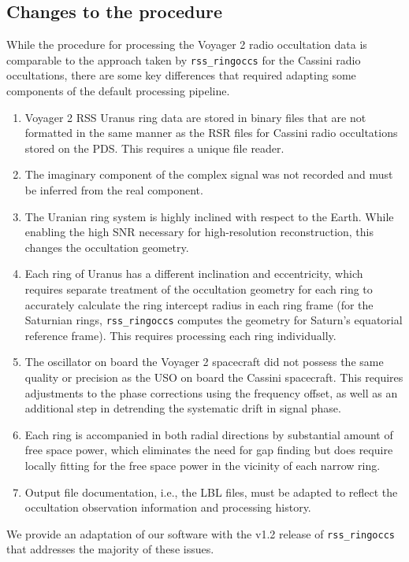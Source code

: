 \documentclass[titlepage, 12pt]{article}
\begin{document}
            \subsection{Changes to the procedure}
            While the procedure for processing the Voyager 2 radio occultation data is comparable 
            to the approach taken by \texttt{rss\_ringoccs} for the Cassini radio occultations, 
            there are some key differences that required adapting some components of the default processing pipeline.
            \begin{enumerate}
                \item Voyager 2 RSS Uranus ring  data are stored in binary files that are not formatted in the same manner 
                as the RSR files for Cassini radio occultations stored on the PDS. This requires a 
                unique file reader.
                \item The imaginary component of the complex signal was not recorded and must be 
                inferred from the real component.
                \item The Uranian ring system is highly inclined with respect to the Earth. While enabling the high SNR 
                necessary for high-resolution reconstruction, this changes the occultation geometry.
                \item Each ring of Uranus has a different inclination and eccentricity, which 
                requires separate treatment of the occultation geometry for each ring to 
                accurately calculate the ring intercept radius in each ring frame (for the 
                Saturnian rings, \texttt{rss\_ringoccs} computes the geometry for Saturn's 
                equatorial reference frame). This requires processing each ring individually.
                \item The oscillator on board the Voyager 2 spacecraft did not possess the same 
                quality or precision as the USO on board the Cassini spacecraft. This requires 
                adjustments to the phase corrections using the frequency offset, as well as an 
                additional step in detrending the systematic drift in signal phase.
                \item Each ring is accompanied in both radial directions by substantial amount of 
                free space power, which eliminates the need for gap finding but does require locally fitting for the 
                free space power in the vicinity of each narrow ring.
                \item Output file documentation, i.e., the LBL files, must be adapted to reflect the 
                occultation observation information and processing history.
            \end{enumerate}
            We provide an adaptation of our software with the v1.2 release of \texttt{rss\_ringoccs} 
            that addresses the majority of these issues.
             \par\hfill\par
\end{document}
